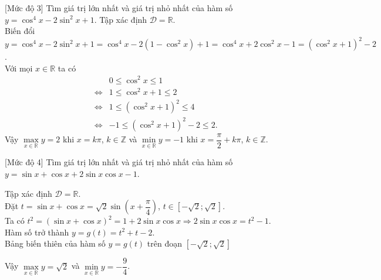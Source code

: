 \begin{bt}%
	[Mức độ 3]
	Tìm giá trị lớn nhất và giá trị nhỏ nhất của hàm số $y=\cos^4 x-2 \sin^2 x+1$.
	\loigiai
	{
		Tập xác định $\mathscr{D}=\mathbb{R}$.\\
		Biến đổi $y=\cos^4 x-2 \sin^2 x+1=\cos^4 x-2 \left(1-\cos^2 x\right)+1=\cos^4 x+2 \cos^2 x-1=\left(\cos^2 x+1\right)^2-2 $.\\
		Với mọi $x\in \mathbb{R}$ ta có
		\allowdisplaybreaks
		\begin{eqnarray*}
			& & 0\leq \cos^2 x\leq 1\\
			&\Leftrightarrow& 1\leq \cos^2 x+1\leq 2\\
			&\Leftrightarrow&1\leq \left( \cos^2 x+1\right)^2\leq 4\\
			&\Leftrightarrow&-1\leq \left( \cos^2 x+1\right)^2-2\leq 2.
		\end{eqnarray*}
		Vậy $\max\limits_{x \in \mathbb{R}} y=2$ khi $x=k\pi$, $k\in \mathbb{Z}$ và $\min\limits_{x \in \mathbb{R}} y=-1$ khi $x=\dfrac{\pi}{2}+k\pi$, $k\in \mathbb{Z}$.
	}
\end{bt}

\begin{bt}%
	[Mức độ 4]
	Tìm giá trị lớn nhất và giá trị nhỏ nhất của hàm số $y=\sin x+\cos x+2 \sin x \cos x-1$.
	\loigiai
	{
		Tập xác định $\mathscr{D}=\mathbb{R}$.\\
		Đặt $t=\sin x+ \cos x=\sqrt{2}\sin \left(x+\dfrac{\pi}{4}\right)$, $t\in \left[-\sqrt{2};\sqrt{2}\right]$.\\
		Ta có $t^2=\left(\sin x+ \cos x\right)^2=1+2\sin x\cos x\Rightarrow 2\sin x\cos x =t^2-1$.\\
		Hàm số trở thành $y=g(t)=t^2+t-2$. \\
		Bảng biến thiên của hàm số $y=g(t)$ trên đoạn $ \left[-\sqrt{2};\sqrt{2}\right]$
		\begin{center}
		\end{center}
		Vậy $\max\limits_{x \in \mathbb{R}} y=\sqrt{2}$ và $\min\limits_{x \in \mathbb{R}} y=-\dfrac{9}{4}$.
	}
\end{bt}

